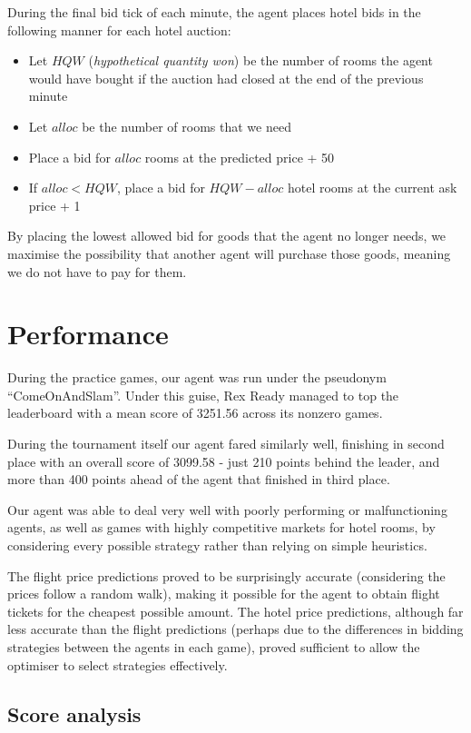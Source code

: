 \documentclass[a4paper]{proc}
\begin{document}
During the final bid tick of each minute, the agent places hotel bids in the following manner for each hotel auction:

\begin{itemize}
  \item Let $HQW$ (\emph{hypothetical quantity won}) be the number of rooms the agent would have bought if the auction had closed at the end of the previous minute
  \item Let $alloc$ be the number of rooms that we need
  \item Place a bid for $alloc$ rooms at the predicted price + 50
  \item If $alloc < HQW$, place a bid for $HQW - alloc$ hotel rooms at the current ask price + 1
\end{itemize}

By placing the lowest allowed bid for goods that the agent no longer needs, we maximise the possibility that another agent will purchase those goods, meaning we do not have to pay for them.

\section{Performance}

During the practice games, our agent was run under the pseudonym ``ComeOnAndSlam''. Under this guise, Rex Ready managed to top the leaderboard with a mean score of 3251.56 across its nonzero games.

During the tournament itself our agent fared similarly well, finishing in second place with an overall score of 3099.58 - just 210 points behind the leader, and more than 400 points ahead of the agent that finished in third place.

Our agent was able to deal very well with poorly performing or malfunctioning agents, as well as games with highly competitive markets for hotel rooms, by considering every possible strategy rather than relying on simple heuristics.

The flight price predictions proved to be surprisingly accurate (considering the prices follow a random walk), making it possible for the agent to obtain flight tickets for the cheapest possible amount. The hotel price predictions, although far less accurate than the flight predictions (perhaps due to the differences in bidding strategies between the agents in each game), proved sufficient to allow the optimiser to select strategies effectively.

\subsection{Score analysis}
\end{document}
